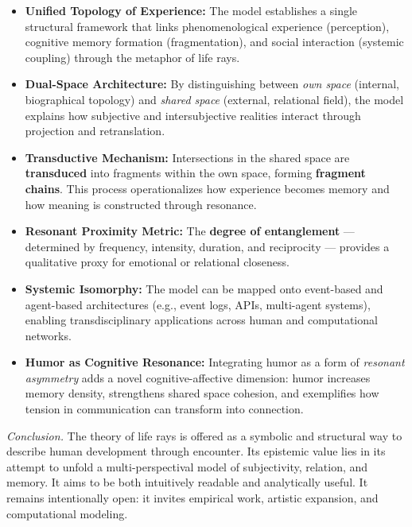 \begin{itemize}
    \item \textbf{Unified Topology of Experience:}
    The model establishes a single structural framework that links phenomenological experience (perception), cognitive memory formation (fragmentation), and social interaction (systemic coupling) through the metaphor of life rays.

    \item \textbf{Dual-Space Architecture:}
    By distinguishing between \textit{own space} (internal, biographical topology) and \textit{shared space} (external, relational field), the model explains how subjective and intersubjective realities interact through projection and retranslation.

    \item \textbf{Transductive Mechanism:} 
    Intersections in the shared space are \textbf{transduced} into fragments within the own space, forming \textbf{fragment chains}.
    This process operationalizes how experience becomes memory and how meaning is constructed through resonance.

    \item \textbf{Resonant Proximity Metric:}
    The \textbf{degree of entanglement} — determined by frequency, intensity, duration, and reciprocity — provides a qualitative proxy for emotional or relational closeness.

    \item \textbf{Systemic Isomorphy:}
    The model can be mapped onto event-based and agent-based architectures (e.g., event logs, APIs, multi-agent systems), enabling transdisciplinary applications across human and computational networks.

    \item \textbf{Humor as Cognitive Resonance:} 
    Integrating humor as a form of \textit{resonant asymmetry} adds a novel cognitive-affective dimension:
    humor increases memory density, strengthens shared space cohesion, and exemplifies how tension in communication can transform into connection.
\end{itemize}

\vspace{1em}
\noindent
\textit{Conclusion.}
The theory of life rays is offered as a symbolic and structural way to describe human development through encounter.
Its epistemic value lies in its attempt to unfold a multi-perspectival model of subjectivity, relation, and memory.
It aims to be both intuitively readable and analytically useful. It remains intentionally open: it invites empirical work, artistic expansion, and computational modeling.
